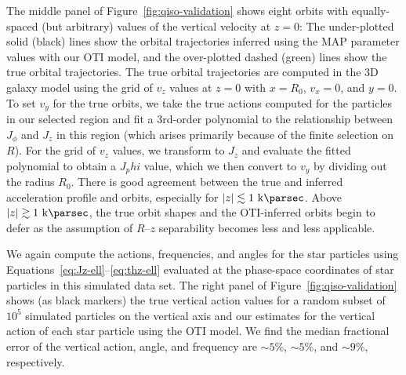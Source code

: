 The middle panel of Figure~\ref{fig:qiso-validation} shows eight orbits with
equally-spaced (but arbitrary) values of the vertical velocity at $z=0$: The
under-plotted solid (black) lines show the orbital trajectories inferred using the MAP
parameter values with our OTI model, and the over-plotted dashed (green) lines show the
true orbital trajectories.
The true orbital trajectories are computed in the 3D galaxy model using the grid of
$v_z$ values at $z=0$ with $x=R_0$, $v_x=0$, and $y=0$.
To set $v_y$ for the true orbits, we take the true actions computed for the particles in
our selected region and fit a 3rd-order polynomial to the relationship between $J_\phi$
and $J_z$ in this region (which arises primarily because of the finite selection on
$R$).
For the grid of $v_z$ values, we transform to $J_z$ and evaluate the fitted polynomial
to obtain a $J_phi$ value, which we then convert to $v_y$ by dividing out the radius
$R_0$.
There is good agreement between the true and inferred acceleration profile and orbits,
especially for $|z| \lesssim 1~\kpc$.
Above $|z| \gtrsim 1~\kpc$, the true orbit shapes and the OTI-inferred orbits begin to
defer as the assumption of $R$--$z$ separability becomes less and less applicable.

We again compute the actions, frequencies, and angles for the star particles using
Equations~\ref{eq:Jz-ell}--\ref{eq:thz-ell} evaluated at the phase-space coordinates of
star particles in this simulated data set.
The right panel of Figure~\ref{fig:qiso-validation} shows (as black markers) the true
vertical action values for a random subset of $10^5$ simulated particles on the vertical
axis and our estimates for the vertical action of each star particle using the OTI
model.
We find the median fractional error of the vertical action, angle, and frequency are
$\sim 5\%$, $\sim 5\%$, and $\sim 9\%$, respectively. 


